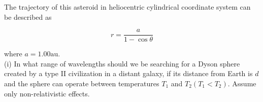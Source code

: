 \documentclass[10pt]{article}
\begin{document}
The trajectory of this asteroid in heliocentric cylindrical coordinate system can be described as

$$
r=\frac{a}{1-\cos \theta}
$$

where $a=1.00 \mathrm{au}$.\\
(i) In what range of wavelengths should we be searching for a Dyson sphere created by a type II civilization in a distant galaxy, if its distance from Earth is $d$ and the sphere can operate between temperatures $T_{1}$ and $T_{2}\left(T_{1}<T_{2}\right)$. Assume only non-relativistic effects.
\end{document}
